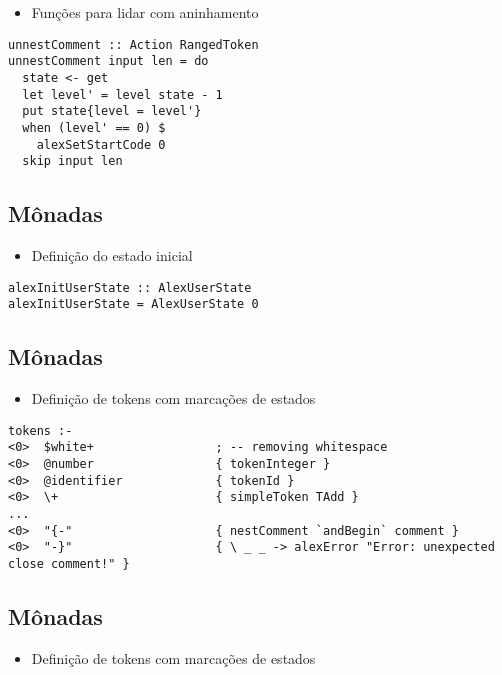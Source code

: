 \documentclass[11pt]{article}
\begin{document}
\begin{itemize}
\item Funções para lidar com aninhamento
\end{itemize}

\begin{verbatim}
unnestComment :: Action RangedToken
unnestComment input len = do
  state <- get
  let level' = level state - 1
  put state{level = level'}
  when (level' == 0) $
    alexSetStartCode 0
  skip input len
\end{verbatim}
\subsection*{Mônadas}
\label{sec:orgd49914c}

\begin{itemize}
\item Definição do estado inicial
\end{itemize}

\begin{verbatim}
alexInitUserState :: AlexUserState
alexInitUserState = AlexUserState 0
\end{verbatim}
\subsection*{Mônadas}
\label{sec:orgf992621}

\begin{itemize}
\item Definição de tokens com marcações de estados
\end{itemize}

\begin{verbatim}
tokens :-
<0>  $white+                 ; -- removing whitespace
<0>  @number                 { tokenInteger }
<0>  @identifier             { tokenId }
<0>  \+                      { simpleToken TAdd }
...
<0>  "{-"                    { nestComment `andBegin` comment }
<0>  "-}"                    { \ _ _ -> alexError "Error: unexpected close comment!" }
\end{verbatim}
\subsection*{Mônadas}
\label{sec:org4681a10}

\begin{itemize}
\item Definição de tokens com marcações de estados
\end{itemize}
\end{document}
